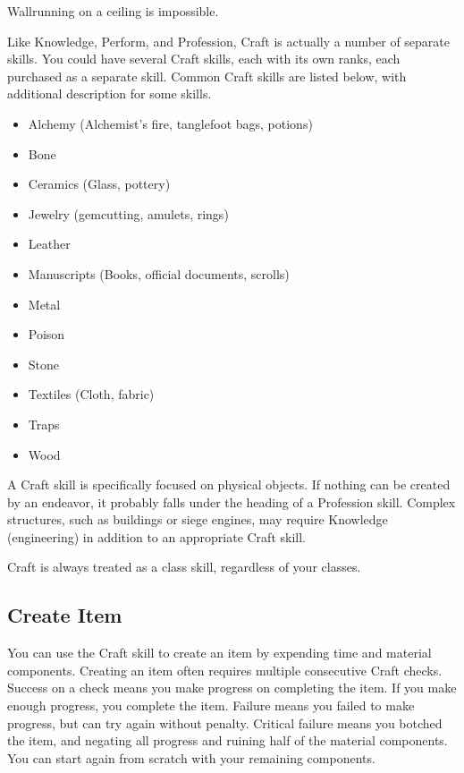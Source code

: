         Wallrunning on a ceiling is impossible.

        Like Knowledge, Perform, and Profession, Craft is actually a number of separate skills. You could have several Craft skills, each with its own ranks, each purchased as a separate skill. Common Craft skills are listed below, with additional description for some skills.

        \begin{itemize}
            \item Alchemy (Alchemist's fire, tanglefoot bags, potions)
            \item Bone
            \item Ceramics (Glass, pottery)
            \item Jewelry (gemcutting, amulets, rings)
            \item Leather
            \item Manuscripts (Books, official documents, scrolls)
            \item Metal
            \item Poison
            \item Stone
            \item Textiles (Cloth, fabric)
            \item Traps
            \item Wood
        \end{itemize}

        A Craft skill is specifically focused on physical objects. If nothing can be created by an endeavor, it probably falls under the heading of a Profession skill. Complex structures, such as buildings or siege engines, may require Knowledge (engineering) in addition to an appropriate Craft skill.

         Craft is always treated as a class skill, regardless of your classes.

    \subsection{Create Item}
        You can use the Craft skill to create an item by expending time and material components. Creating an item often requires multiple consecutive Craft checks. Success on a check means you make progress on completing the item. If you make enough progress, you complete the item. Failure means you failed to make progress, but can try again without penalty. Critical failure means you botched the item, and negating all progress and ruining half of the material components. You can start again from scratch with your remaining components.

